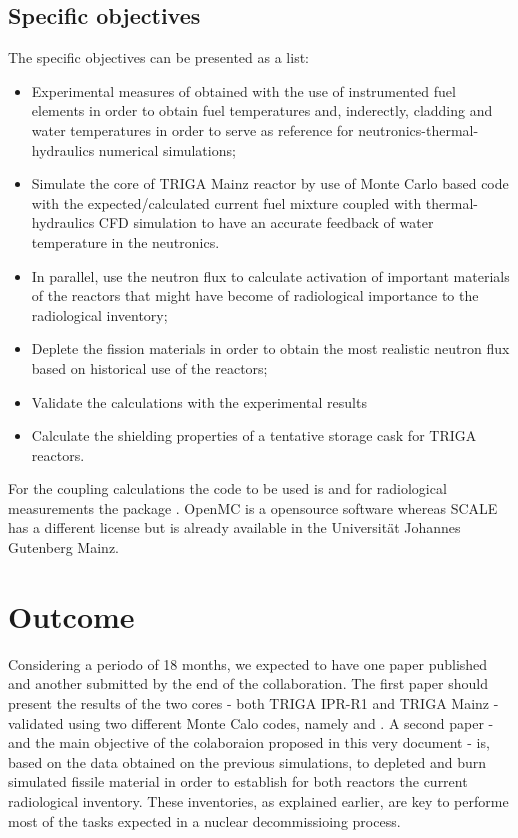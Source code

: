 \documentclass[11pt]{article} %
\begin{document}
\subsection{Specific objectives}

The specific objectives can be presented as a list:
\begin{itemize}
  \item  Experimental measures of obtained with the use of instrumented fuel elements in order to obtain fuel temperatures and, inderectly, cladding and water temperatures in order to serve as reference for neutronics-thermal-hydraulics numerical simulations;
  \item Simulate the core of TRIGA Mainz reactor by use of Monte Carlo based code with the expected/calculated current fuel mixture coupled with thermal-hydraulics CFD simulation to have an accurate feedback of water temperature in the neutronics. 
\item In parallel, use the neutron flux to calculate activation of important materials of the reactors that might have become of radiological importance to the radiological inventory;
\item Deplete the fission materials in order to obtain the most realistic neutron flux based on historical use of the reactors;
\item Validate the calculations with the experimental results
  \item Calculate the shielding properties of a tentative storage cask for TRIGA reactors.
  
\end{itemize}

For the coupling calculations the code to be used is \cite{OpenMC2015} and for radiological measurements the package \cite{SCALE_632}. OpenMC is a opensource software whereas SCALE has a different license but is already available in the Universität Johannes Gutenberg Mainz.

\section{Outcome}

Considering a periodo of 18 months, we expected to have one paper published and another submitted by the end of the collaboration. The first paper should present the results of the two cores - both TRIGA IPR-R1 and TRIGA Mainz - validated using two different Monte Calo codes, namely \cite[OpenMC]{OpenMC2015} and \cite[SCALE]{SCALE_632}. A second paper - and the main objective of the colaboraion proposed in this very document - is, based on the data obtained on the previous simulations, to depleted and burn simulated fissile material in order to establish for both reactors the current radiological inventory. These inventories, as explained earlier, are key to performe most of the tasks expected in a nuclear decommissioing process.
\end{document}

